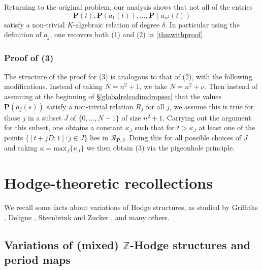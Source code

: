 \documentclass[10pt]{article}
\numberwithin{equation}{section}
\theoremstyle{plain}
\theoremstyle{definition}
\theoremstyle{remark}
\begin{document}
Returning to the original problem, our analysis shows that not all of the entries
\[ \mathbf{P}(t), \mathbf{P}(a_{1}(t)), \hdots, \mathbf{P}(a_{n^2}(t)) \]
satisfy a non-trivial $K$-algebraic relation of degree $\delta$. In particular using the definition of $a_{j}$, one recovers both (1) and (2) in \autoref{thmwithproof}.

\subsubsection{Proof of (3)}

The structure of the proof for (3) is analogous to that of (2), with the following modifications. Instead of taking $N = n^2 + 1$, we take $N = n^2 + \nu$. Then instead of assuming at the beginning of \S\ref{globalrelcodimdropsec} that the values $\mathbf{P}(a_{j}(s))$ satisfy a non-trivial relation $R_{j}$ for all $j$, we assume this is true for those $j$ in a subset $J$ of $\{ 0, \hdots, N-1 \}$ of size $n^2 + 1$. Carrying out the argument for this subset, one obtains a constant $\kappa_{J}$ such that for $t > \kappa_{J}$ at least one of the points $\{ [t + j D : 1] : j \in J \}$ lies in $\mathcal{R}_{\mathbf{P},\delta}$. Doing this for all possible choices of $J$ and taking $\kappa = \textrm{max}_{J}\{ \kappa_{J}\}$ we then obtain (3) via the pigeonhole principle.

 




\section{Hodge-theoretic recollections}\label{sec5}
We recall some facts about variations of Hodge structures, as studied by Griffiths \cite{Griffiths}, Deligne \cite{MR0498551}, Steenbrink and Zucker \cite{zbMATH04017061}, and many others.


\subsection{Variations of (mixed) $\mathbb{Z}$-Hodge structures and period maps}
\label{vhsandpermapsec}
\end{document}
